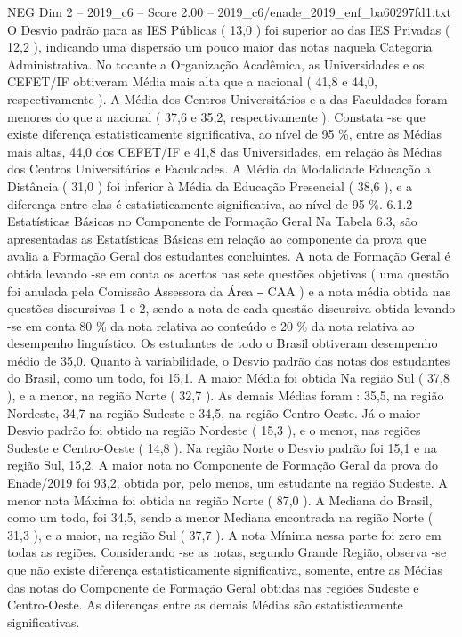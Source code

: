 \begin{textsample}{NEG Dim 2 – 2019\_c6 – Score 2.00 – 2019\_c6/enade\_2019\_enf\_ba60297fd1.txt}
O Desvio padrão para as IES Públicas ( 13,0 ) foi superior ao das IES Privadas ( 12,2 ), indicando uma dispersão um pouco maior das notas naquela Categoria Administrativa.
No tocante a Organização Acadêmica, as Universidades e os CEFET/IF obtiveram Média mais alta que a nacional ( 41,8 e 44,0, respectivamente ).
A Média dos Centros Universitários e a das Faculdades foram menores do que a nacional ( 37,6 e 35,2, respectivamente ).
Constata -se que existe diferença estatisticamente significativa, ao nível de 95 \%, entre as Médias mais altas, 44,0 dos CEFET/IF e 41,8 das Universidades, em relação às Médias dos Centros Universitários e Faculdades.
A Média da Modalidade Educação a Distância ( 31,0 ) foi inferior à Média da Educação Presencial ( 38,6 ), e a diferença entre elas é estatisticamente significativa, ao nível de 95 \%. 6.1.2 Estatísticas Básicas no Componente de Formação Geral Na Tabela 6.3, são apresentadas as Estatísticas Básicas em relação ao componente da prova que avalia a Formação Geral dos estudantes concluintes.
A nota de Formação Geral é obtida levando -se em conta os acertos nas sete questões objetivas ( uma questão foi anulada pela Comissão Assessora da Área ‒ CAA ) e a nota média obtida nas questões discursivas 1 e 2, sendo a nota de cada questão discursiva obtida levando -se em conta 80 \% da nota relativa ao conteúdo e 20 \% da nota relativa ao desempenho linguístico.
Os estudantes de todo o Brasil obtiveram desempenho médio de 35,0.
Quanto à variabilidade, o Desvio padrão das notas dos estudantes do Brasil, como um todo, foi 15,1.
A maior Média foi obtida Na região Sul ( 37,8 ), e a menor, na região Norte ( 32,7 ).
As demais Médias foram : 35,5, na região Nordeste, 34,7 na região Sudeste e 34,5, na região Centro-Oeste.
Já o maior Desvio padrão foi obtido na região Nordeste ( 15,3 ), e o menor, nas regiões Sudeste e Centro-Oeste ( 14,8 ).
Na região Norte o Desvio padrão foi 15,1 e na região Sul, 15,2.
A maior nota no Componente de Formação Geral da prova do Enade/2019 foi 93,2, obtida por, pelo menos, um estudante na região Sudeste.
A menor nota Máxima foi obtida na região Norte ( 87,0 ).
A Mediana do Brasil, como um todo, foi 34,5, sendo a menor Mediana encontrada na região Norte ( 31,3 ), e a maior, na região Sul ( 37,7 ).
A nota Mínima nessa parte foi zero em todas as regiões.
Considerando -se as notas, segundo Grande Região, observa -se que não existe diferença estatisticamente significativa, somente, entre as Médias das notas do Componente de Formação Geral obtidas nas regiões Sudeste e Centro-Oeste.
As diferenças entre as demais Médias são estatisticamente significativas.

\end{textsample}
